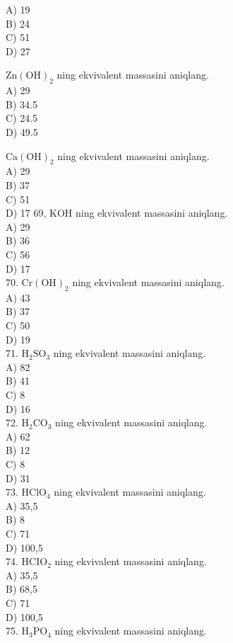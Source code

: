 A) 19\\
B) 24\\
C) 51\\
D) 27
  \item $\mathrm{Zn}(\mathrm{OH})_{2}$ ning ekvivalent massasini aniqlang.\\
A) 29\\
B) 34.5\\
C) 24.5\\
D) 49.5
  \item $\mathrm{Ca}(\mathrm{OH})_{2}$ ning ekvivalent massasini aniqlang.\\
A) 29\\
B) 37\\
C) 51\\
D) 17
69, KOH ning ekvivalent massasini aniqlang.\\
A) 29\\
B) 36\\
C) 56\\
D) 17\\
70. $\mathrm{Cr}(\mathrm{OH})_{2}$ ning ekvivalent massasini aniqlang.\\
A) 43\\
B) 37\\
C) 50\\
D) 19\\
71. $\mathrm{H}_{2} \mathrm{SO}_{3}$ ning ekvivalent massasini aniqlang.\\
A) 82\\
B) 41\\
C) 8\\
D) 16\\
72. $\mathrm{H}_{2} \mathrm{CO}_{3}$ ning ekvivalent massasini aniqlang.\\
A) 62\\
B) 12\\
C) 8\\
D) 31\\
73. $\mathrm{HClO}_{4}$ ning ekvivalent massasini aniqlang.\\
A) 35,5\\
B) 8\\
C) 71\\
D) 100,5\\
74. $\mathrm{HCIO}_{2}$ ning ekvivalent massasini aniqlang.\\
A) 35,5\\
B) 68,5\\
C) 71\\
D) 100,5\\
75. $\mathrm{H}_{3} \mathrm{PO}_{4}$ ning ekvivalent massasini aniqlang.\\
